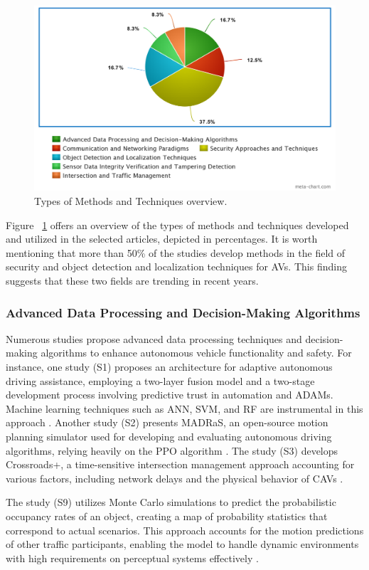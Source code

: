 \documentclass[a4paper,12pt]{article}
\begin{document}
\begin{figure}[H]
  \centering
  \includegraphics*[width=1.1\columnwidth]{img/Types of Methods and Techniques overview}
  \caption{Types of Methods and Techniques overview.}   
  \label{fig:Types of Methods and Techniques overview}
\end{figure}

\hspace{5mm} Figure ~\ref{fig:Types of Methods and Techniques overview} offers an overview of the types of methods and techniques developed and utilized in the selected articles, depicted in percentages. It is worth mentioning that more than 50\% of the studies develop methods in the field of security and object detection and localization techniques for AVs. This finding suggests that these two fields are trending in recent years. \par

\subsubsection{Advanced Data Processing and Decision-Making Algorithms}
\hspace{5mm} Numerous studies propose advanced data processing techniques and decision-making algorithms to enhance autonomous vehicle functionality and safety. For instance, one study (S1) proposes an architecture for adaptive autonomous driving assistance, employing a two-layer fusion model and a two-stage development process involving predictive trust in automation and ADAMs. Machine learning techniques such as ANN, SVM, and RF are instrumental in this approach \cite{s1}. Another study (S2) presents MADRaS, an open-source motion planning simulator used for developing and evaluating autonomous driving algorithms, relying heavily on the PPO algorithm \cite{s2}. The study (S3) develops Crossroads+, a time-sensitive intersection management approach accounting for various factors, including network delays and the physical behavior of CAVs \cite{s3}.\par
The study (S9) utilizes Monte Carlo simulations to predict the probabilistic occupancy rates of an object, creating a map of probability statistics that correspond to actual scenarios. This approach accounts for the motion predictions of other traffic participants, enabling the model to handle dynamic environments with high requirements on perceptual systems effectively \cite{s9}.
\end{document}
